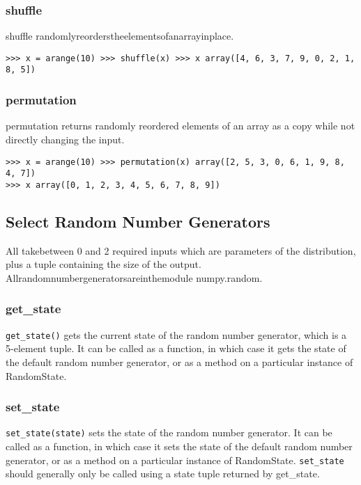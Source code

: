 \documentclass[KSmain.tex]{subfiles}
\begin{document}
\subsubsection{shuffle}
shuffle randomlyreorderstheelementsofanarrayinplace.
\begin{verbatim}
>>> x = arange(10) >>> shuffle(x) >>> x array([4, 6, 3, 7, 9, 0, 2, 1, 8, 5])
\end{verbatim}
\subsubsection{permutation}
permutation returns randomly reordered elements of an array as a copy while not directly changing the input.
\begin{framed}
\begin{verbatim}
>>> x = arange(10) >>> permutation(x) array([2, 5, 3, 0, 6, 1, 9, 8, 4, 7])
>>> x array([0, 1, 2, 3, 4, 5, 6, 7, 8, 9])
\end{verbatim}
\end{framed}
\subsection{Select Random Number Generators}

All takebetween 0 and 2 required inputs which are parameters of the distribution, plus a tuple containing the size of the output. Allrandomnumbergeneratorsareinthemodule 
numpy.random.


\newpage
\subsubsection{get\_state}
\texttt{get\_state()} gets the current state of the random number generator, which is a 5-element tuple. It can be
called as a function, in which case it gets the state of the default random number generator, or as a method
on a particular instance of RandomState.
\subsubsection{set_state}
\texttt{set_state(state)} sets the state of the random number generator. It can be called as a function, in which
case it sets the state of the default random number generator, or as a method on a particular instance of
RandomState. \texttt{set\_state} should generally only be called using a state tuple returned by get\_state.
\end{document}
